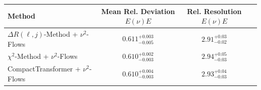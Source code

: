    \begin{tabular}{lccc}
        \toprule
        Method & Mean Rel. Deviation $E(\nu)E$ & Rel. Resolution $E(\nu)E$ \\
        \midrule
        $\Delta R(\ell,j)$-Method + $\nu^2$-Flows & $0.611^{+0.003}_{-0.005}$ & $2.91^{+0.03}_{-0.02}$ \\
        $\chi^2$-Method + $\nu^2$-Flows & $0.610^{+0.002}_{-0.003}$ & $2.94^{+0.05}_{-0.03}$ \\
        CompactTransformer + $\nu^2$-Flows & $0.610^{+0.004}_{-0.003}$ & $2.93^{+0.04}_{-0.03}$ \\
        \bottomrule
    \end{tabular}